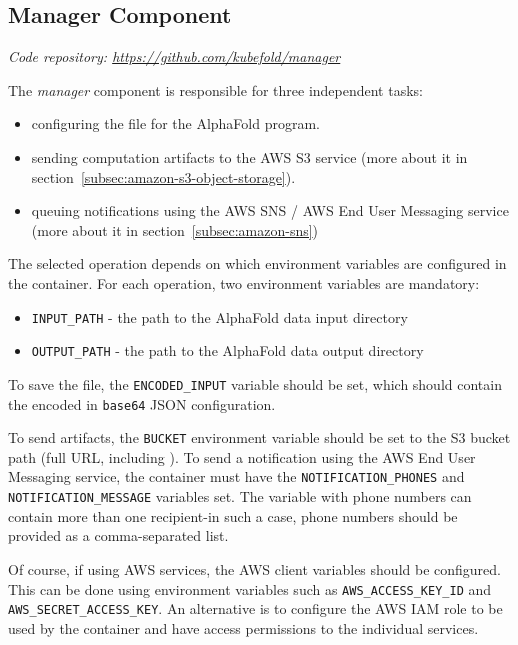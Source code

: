 \subsection{Manager Component}\label{subsec:component-manager}
\textit{Code repository: \url{https://github.com/kubefold/manager}}

The \textit{manager} component is responsible for three independent tasks:
\begin{itemize}
    \item configuring the  file for the AlphaFold program.
    \item sending computation artifacts to the AWS S3 service (more about it in section~\ref{subsec:amazon-s3-object-storage}).
    \item queuing notifications using the AWS SNS / AWS End User Messaging service (more about it in section~\ref{subsec:amazon-sns})
\end{itemize}

The selected operation depends on which environment variables are configured in the container.
For each operation, two environment variables are mandatory:
\begin{itemize}
    \item \texttt{INPUT\_PATH} - the path to the AlphaFold data input directory
    \item \texttt{OUTPUT\_PATH} - the path to the AlphaFold data output directory
\end{itemize}

To save the  file, the \texttt{ENCODED\_INPUT} variable should be set, which should contain the encoded in \texttt{base64} JSON configuration.

To send artifacts, the \texttt{BUCKET} environment variable should be set to the S3 bucket path (full URL, including ).
To send a notification using the AWS End User Messaging service, the container must have the \texttt{NOTIFICATION\_PHONES} and \texttt{NOTIFICATION\_MESSAGE} variables set.
The variable with phone numbers can contain more than one recipient-in such a case, phone numbers should be provided as a comma-separated list.

Of course, if using AWS services, the AWS client variables should be configured.
This can be done using environment variables such as \texttt{AWS\_ACCESS\_KEY\_ID} and \texttt{AWS\_SECRET\_ACCESS\_KEY}.
An alternative is to configure the AWS IAM role to be used by the container and have access permissions to the individual services.
